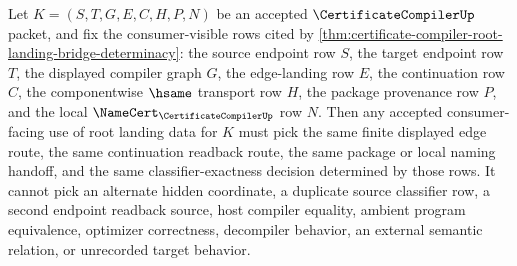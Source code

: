 \begin{corollary}
\label{cor:certificate-compiler-root-landing-consumer-determinacy}
Let $K=(S,T,G,E,C,H,P,N)$ be an accepted $\CertificateCompilerUp$ packet, and fix the consumer-visible rows cited by \autoref{thm:certificate-compiler-root-landing-bridge-determinacy}: the source endpoint row $S$, the target endpoint row $T$, the displayed compiler graph $G$, the edge-landing row $E$, the continuation row $C$, the componentwise $\hsame$ transport row $H$, the package provenance row $P$, and the local $\NameCert_{\CertificateCompilerUp}$ row $N$. Then any accepted consumer-facing use of root landing data for $K$ must pick the same finite displayed edge route, the same continuation readback route, the same package or local naming handoff, and the same classifier-exactness decision determined by those rows. It cannot pick an alternate hidden coordinate, a duplicate source classifier row, a second endpoint readback source, host compiler equality, ambient program equivalence, optimizer correctness, decompiler behavior, an external semantic relation, or unrecorded target behavior.
\end{corollary}
